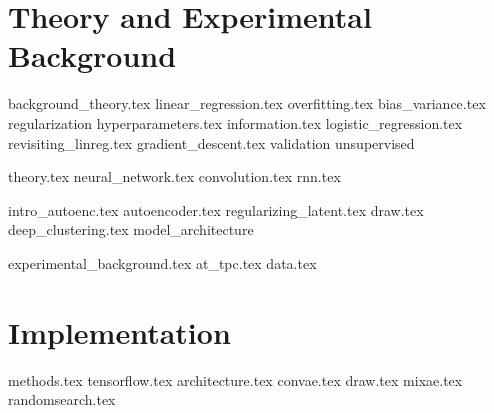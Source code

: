 \documentclass[12pt]{uiofysmaster}
\begin{document}
\part{Theory and Experimental Background}\label{part:theory_experiment}

{background_theory.tex}
{linear_regression.tex}
{overfitting.tex}
{bias_variance.tex}
{regularization}
{hyperparameters.tex}
{information.tex}
{logistic_regression.tex}
{revisiting_linreg.tex}
{gradient_descent.tex}
{validation}
{unsupervised}

{theory.tex}
{neural_network.tex}
{convolution.tex}
{rnn.tex}

{intro_autoenc.tex}
{autoencoder.tex}
{regularizing_latent.tex}
{draw.tex}
{deep_clustering.tex}
{model_architecture}



{experimental_background.tex}
{at_tpc.tex}
{data.tex}


\part{Implementation}\label{part:implement}

{methods.tex}
{tensorflow.tex}
{architecture.tex}
{convae.tex}
{draw.tex}
{mixae.tex}
{randomsearch.tex}
\end{document}
